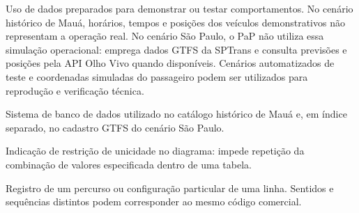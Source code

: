 \documentclass[12pt,oneside,a4paper,brazil,chapter=TITLE]{abntex2}
\begin{document}
\begin{description}[style=nextline,leftmargin=0pt,labelwidth=0pt,font=\bfseries,itemsep=0.5\baselineskip]
\item[Simulação ou dados mockados] Uso de dados preparados para demonstrar ou testar comportamentos. No cenário histórico de Mauá, horários, tempos e posições dos veículos demonstrativos não representam a operação real. No cenário São Paulo, o PaP não utiliza essa simulação operacional: emprega dados GTFS da SPTrans e consulta previsões e posições pela API Olho Vivo quando disponíveis. Cenários automatizados de teste e coordenadas simuladas do passageiro podem ser utilizados para reprodução e verificação técnica.
\item[SQLite] Sistema de banco de dados utilizado no catálogo histórico de Mauá e, em índice separado, no cadastro GTFS do cenário São Paulo.
\item[UQ (Unique)] Indicação de restrição de unicidade no diagrama: impede repetição da combinação de valores especificada dentro de uma tabela.
\item[Variante de linha] Registro de um percurso ou configuração particular de uma linha. Sentidos e sequências distintos podem corresponder ao mesmo código comercial.
\end{description}
\end{document}
